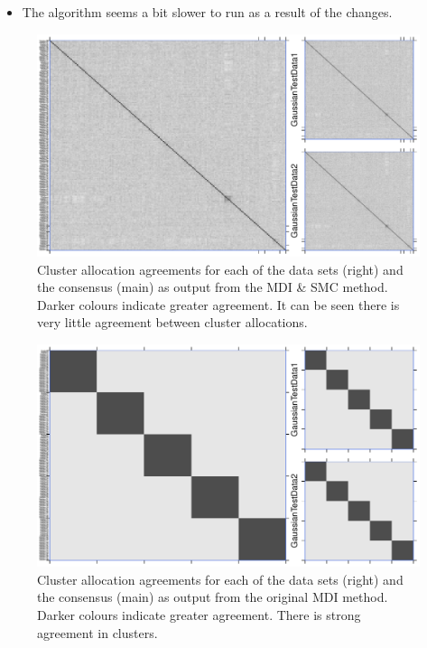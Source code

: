 \documentclass[10pt,a4paper]{report}
\begin{document}
\begin{itemize}
\begin{itemize}
\end{itemize}
\item The algorithm seems a bit slower to run as a result of the changes.
\end{itemize}

\begin{figure}
\includegraphics[width = \linewidth]{plots/agree_mdismc.pdf}
\caption{Cluster allocation agreements for each of the data sets (right) and the consensus (main) as output from the MDI \& SMC method. Darker colours indicate greater agreement. It can be seen there is very little agreement between cluster allocations.}
\end{figure}

\begin{figure}
\includegraphics[width = \linewidth]{plots/agree_mdi.pdf}
\caption{Cluster allocation agreements for each of the data sets (right) and the consensus (main) as output from the original MDI method. Darker colours indicate greater agreement. There is strong agreement in clusters.}
\end{figure}
\end{document}
